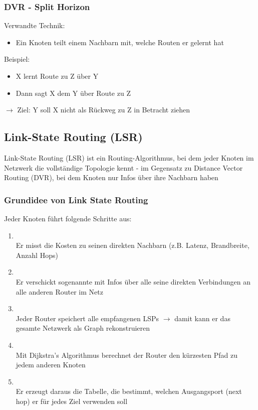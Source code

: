 \subsubsection*{DVR - Split Horizon}
Verwandte Technik:
\begin{itemize}
    \item Ein Knoten teilt einem Nachbarn  mit, welche Routen er  gelernt hat
\end{itemize}
Beispiel:
\begin{itemize}
    \item X lernt Route zu Z über Y
    \item Dann sagt X dem Y  über Route zu Z
\end{itemize}
$\rightarrow$ Ziel: Y soll X nicht als Rückweg zu Z in Betracht ziehen
\subsection{Link-State Routing (LSR)}
Link-State Routing (LSR) ist ein Routing-Algorithmus, bei dem jeder Knoten im Netzwerk die vollständige Topologie kennt - im Gegensatz zu Distance Vector Routing (DVR), bei dem Knoten nur Infos über ihre Nachbarn haben
\subsubsection*{Grundidee von Link State Routing}
Jeder Knoten führt folgende Schritte aus:
\begin{enumerate}
    \item {}\\
    Er misst die Kosten zu seinen direkten Nachbarn (z.B. Latenz, Brandbreite, Anzahl Hops)
    \item {}\\
    Er verschickt sogenannte  mit Infos über alle seine direkten Verbindungen an alle anderen Router im Netz
    \item {}\\
    Jeder Router speichert alle empfangenen LSPs $\rightarrow$ damit kann er das gesamte Netzwerk als Graph rekonstruieren
    \item {}\\
    Mit Dijkstra's Algorithmus berechnet der Router den kürzesten Pfad zu jedem anderen Knoten
    \item {}\\
    Er erzeugt daraus die Tabelle, die bestimmt, welchen Ausgangsport (next hop) er für jedes Ziel verwenden soll
\end{enumerate}
